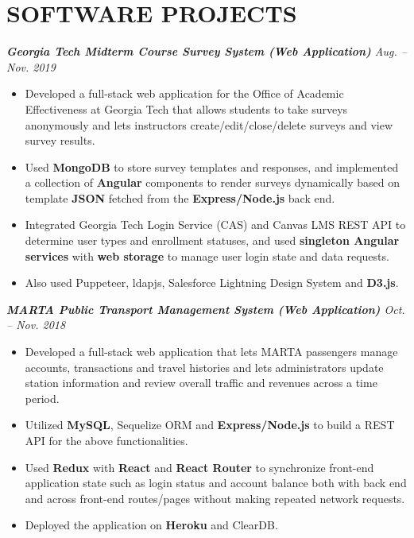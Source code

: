 \documentclass[10pt]{article}
\begin{document}
\section*{SOFTWARE PROJECTS}
{\itshape {\bfseries Georgia Tech Midterm Course Survey System (Web Application)}  \hfill Aug. -- Nov. 2019}
\begin{itemize}[leftmargin=15pt, noitemsep, topsep=0pt]
\item Developed a full-stack web application for the Office of Academic Effectiveness at Georgia Tech that allows students to take surveys anonymously and lets instructors create/edit/close/delete surveys and view survey results.
\item Used \textbf{MongoDB} to store survey templates and responses, and implemented a collection of \textbf{Angular} components to render surveys dynamically based on template \textbf{JSON} fetched from the \textbf{Express/Node.js} back end.
\item Integrated Georgia Tech Login Service (CAS) and Canvas LMS REST API to determine user types and enrollment statuses, and used \textbf{singleton Angular services} with \textbf{web storage} to manage user login state and data requests.
\item Also used Puppeteer, ldapjs, Salesforce Lightning Design System and \textbf{D3.js}.
\end{itemize}
\vspace{0.5em}
%
{\itshape {\bfseries MARTA Public Transport Management System (Web Application)} \hfill Oct. -- Nov. 2018}
\begin{itemize}[leftmargin=15pt, noitemsep, topsep=0pt]
\item Developed a full-stack web application that lets MARTA passengers manage accounts, transactions and travel histories and lets administrators update station information and review overall traffic and revenues across a time period.
\item Utilized \textbf{MySQL}, Sequelize ORM and \textbf{Express/Node.js} to build a REST API for the above functionalities.
\item Used \textbf{Redux} with \textbf{React} and \textbf{React Router} to synchronize front-end application state such as login status and account balance both with back end and across front-end routes/pages without making repeated network requests. 
\item Deployed the application on \textbf{Heroku} and ClearDB.
\end{itemize}
\vspace{0.5em}
\end{document}
